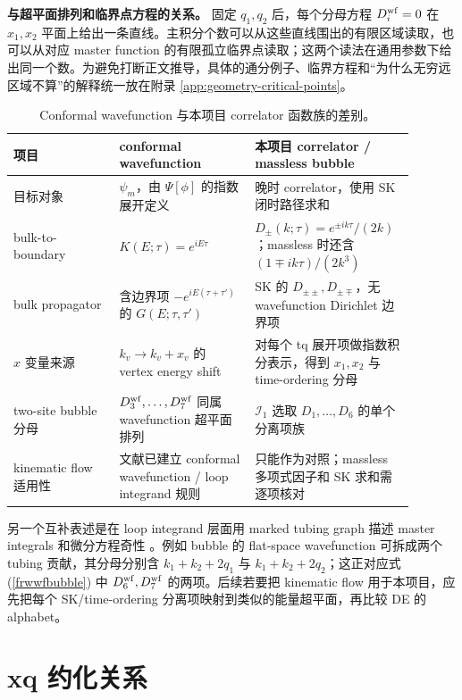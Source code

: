 ﻿\documentclass[a4paper,11pt]{article}
\begin{document}
\textbf{与超平面排列和临界点方程的关系。} 固定 $q_1,q_2$ 后，每个分母方程 $D^{\rm wf}_i=0$ 在 $x_1,x_2$ 平面上给出一条直线。主积分个数可以从这些直线围出的有限区域读取，也可以从对应 master function 的有限孤立临界点读取；这两个读法在通用参数下给出同一个数。为避免打断正文推导，具体的通分例子、临界方程和“为什么无穷远区域不算”的解释统一放在附录 \ref{app:geometry-critical-points}。

\begin{table}[htbp]
    \centering
    \caption{Conformal wavefunction 与本项目 correlator 函数族的差别。}
    \begin{tabular}{p{0.25\linewidth}p{0.32\linewidth}p{0.32\linewidth}}
        \toprule
        项目 & conformal wavefunction & 本项目 correlator / massless bubble \\
        \midrule
        目标对象 & $\psi_m$，由 $\Psi[\phi]$ 的指数展开定义 & 晚时 correlator，使用 SK 闭时路径求和 \\
        bulk-to-boundary & $K(E;\tau)=e^{iE\tau}$ & $D_\pm(k;\tau)=e^{\pm ik\tau}/(2k)$；massless 时还含 $(1\mp ik\tau)/(2k^3)$ \\
        bulk propagator & 含边界项 $-e^{iE(\tau+\tau')}$ 的 $G(E;\tau,\tau')$ & SK 的 $D_{\pm\pm},D_{\pm\mp}$，无 wavefunction Dirichlet 边界项 \\
        $x$ 变量来源 & $k_v\to k_v+x_v$ 的 vertex energy shift & 对每个 tq 展开项做指数积分表示，得到 $x_1,x_2$ 与 time-ordering 分母 \\
        two-site bubble 分母 & $D^{\rm wf}_3,\dots,D^{\rm wf}_7$ 同属 wavefunction 超平面排列 & $\mathcal{I}_1$ 选取 $D_1,\dots,D_6$ 的单个分离项族 \\
        kinematic flow 适用性 & 文献已建立 conformal wavefunction / loop integrand 规则 & 只能作为对照；massless 多项式因子和 SK 求和需逐项核对 \\
        \bottomrule
    \end{tabular}
\end{table}

另一个互补表述是在 loop integrand 层面用 marked tubing graph 描述 master integrals 和微分方程奇性 \cite{Baumann:2024loop}。例如 bubble 的 flat-space wavefunction 可拆成两个 tubing 贡献，其分母分别含 $k_1+k_2+2q_1$ 与 $k_1+k_2+2q_2$；这正对应式 (\ref{frwwfbubble}) 中 $D^{\rm wf}_6,D^{\rm wf}_7$ 的两项。后续若要把 kinematic flow 用于本项目，应先把每个 SK/time-ordering 分离项映射到类似的能量超平面，再比较 DE 的 alphabet。

\newpage
\section{xq 约化关系}
\end{document}
